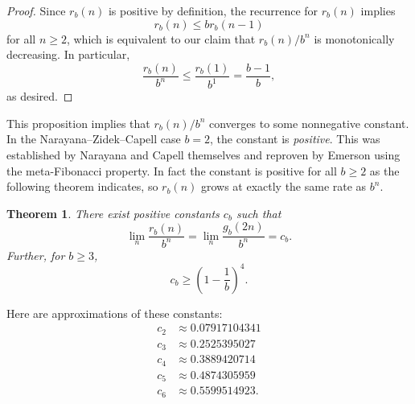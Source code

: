 \documentclass[12pt]{article}
\newtheorem{theorem}{Theorem}
\theoremstyle{definition}
\begin{document}
\begin{proof}
    Since $r_b(n)$ is positive by definition, the recurrence for $r_b(n)$
    implies
    \begin{equation*}
        r_b(n) \leq b r_b(n - 1)
    \end{equation*}
    for all $n \geq 2$, which is equivalent to our claim that $r_b(n) / b^n$
    is monotonically decreasing. In particular,
    \begin{equation*}
        \frac{r_b(n)}{b^n} \leq \frac{r_b(1)}{b^1} = \frac{b - 1}{b},
    \end{equation*}
    as desired.
\end{proof}

This proposition implies that $r_b(n) / b^n$ converges to some nonnegative
constant. In the Narayana--Zidek--Capell case $b = 2$, the constant is
\emph{positive}. This was established by Narayana and Capell themselves
\cite{capell1970knock} and reproven by Emerson \cite{emerson2006family} using
the meta-Fibonacci property. In fact the constant is positive for all $b \geq
2$ as the following theorem indicates, so $r_b(n)$ grows at exactly the same
rate as $b^n$. 

\begin{theorem}
    There exist positive constants $c_b$ such that
    \begin{equation*}
        \lim_n \frac{r_b(n)}{b^n} = \lim_n \frac{g_b(2n)}{b^n} = c_b.
    \end{equation*}
    Further, for $b \geq 3$,
    \begin{equation*}
        c_b \geq \left(1 - \frac{1}{b}\right)^4.
    \end{equation*}
\end{theorem}

Here are approximations of these constants:
\begin{align*}
    c_2 &\approx 0.07917104341 \\
    c_3 &\approx 0.2525395027 \\
    c_4 &\approx 0.3889420714 \\
    c_5 &\approx 0.4874305959 \\
    c_6 &\approx 0.5599514923.
\end{align*}
\end{document}
